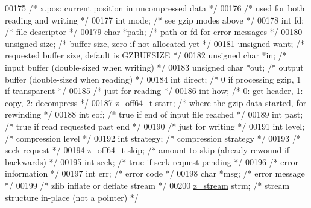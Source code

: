 \begin{DoxyCode}
00175                             \textcolor{comment}{/* x.pos: current position in uncompressed data */}
00176         \textcolor{comment}{/* used for both reading and writing */}
00177     \textcolor{keywordtype}{int} mode;               \textcolor{comment}{/* see gzip modes above */}
00178     \textcolor{keywordtype}{int} fd;                 \textcolor{comment}{/* file descriptor */}
00179     \textcolor{keywordtype}{char} *path;             \textcolor{comment}{/* path or fd for error messages */}
00180     \textcolor{keywordtype}{unsigned} size;          \textcolor{comment}{/* buffer size, zero if not allocated yet */}
00181     \textcolor{keywordtype}{unsigned} want;          \textcolor{comment}{/* requested buffer size, default is GZBUFSIZE */}
00182     \textcolor{keywordtype}{unsigned} \textcolor{keywordtype}{char} *in;      \textcolor{comment}{/* input buffer (double-sized when writing) */}
00183     \textcolor{keywordtype}{unsigned} \textcolor{keywordtype}{char} *out;     \textcolor{comment}{/* output buffer (double-sized when reading) */}
00184     \textcolor{keywordtype}{int} direct;             \textcolor{comment}{/* 0 if processing gzip, 1 if transparent */}
00185         \textcolor{comment}{/* just for reading */}
00186     \textcolor{keywordtype}{int} how;                \textcolor{comment}{/* 0: get header, 1: copy, 2: decompress */}
00187     z\_off64\_t start;        \textcolor{comment}{/* where the gzip data started, for rewinding */}
00188     \textcolor{keywordtype}{int} eof;                \textcolor{comment}{/* true if end of input file reached */}
00189     \textcolor{keywordtype}{int} past;               \textcolor{comment}{/* true if read requested past end */}
00190         \textcolor{comment}{/* just for writing */}
00191     \textcolor{keywordtype}{int} level;              \textcolor{comment}{/* compression level */}
00192     \textcolor{keywordtype}{int} strategy;           \textcolor{comment}{/* compression strategy */}
00193         \textcolor{comment}{/* seek request */}
00194     z\_off64\_t skip;         \textcolor{comment}{/* amount to skip (already rewound if backwards) */}
00195     \textcolor{keywordtype}{int} seek;               \textcolor{comment}{/* true if seek request pending */}
00196         \textcolor{comment}{/* error information */}
00197     \textcolor{keywordtype}{int} err;                \textcolor{comment}{/* error code */}
00198     \textcolor{keywordtype}{char} *msg;              \textcolor{comment}{/* error message */}
00199         \textcolor{comment}{/* zlib inflate or deflate stream */}
00200     \hyperlink{structz__stream__s}{z\_stream} strm;          \textcolor{comment}{/* stream structure in-place (not a pointer) */}

\end{DoxyCode}
